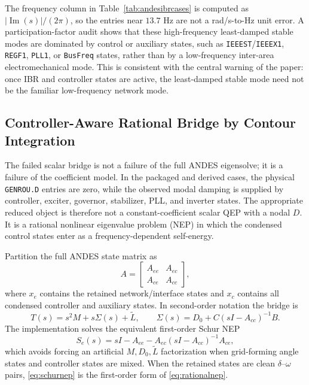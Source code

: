 \documentclass[journal]{IEEEtran}
\newcommand{\Lt}{\widetilde L}
\newcommand{\Imag}{\operatorname{Im}}
\begin{document}
The frequency column in Table~\ref{tab:andesibrcases} is computed as $|\Imag(s)|/(2\pi)$, so the entries near $13.7$ Hz are not a rad/s-to-Hz unit error. A participation-factor audit shows that these high-frequency least-damped stable modes are dominated by control or auxiliary states, such as \texttt{IEEEST}/\texttt{IEEEX1}, \texttt{REGF1}, \texttt{PLL1}, or \texttt{BusFreq} states, rather than by a low-frequency inter-area electromechanical mode. This is consistent with the central warning of the paper: once IBR and controller states are active, the least-damped stable mode need not be the familiar low-frequency network mode.

\subsection{Controller-Aware Rational Bridge by Contour Integration}

The failed scalar bridge is not a failure of the full ANDES eigensolve; it is a failure of the coefficient model. In the packaged and derived cases, the physical \texttt{GENROU.D} entries are zero, while the observed modal damping is supplied by controller, exciter, governor, stabilizer, PLL, and inverter states. The appropriate reduced object is therefore not a constant-coefficient scalar QEP with a nodal $D$. It is a rational nonlinear eigenvalue problem (NEP) in which the condensed control states enter as a frequency-dependent self-energy.

Partition the full ANDES state matrix as
\begin{equation}
A=\begin{bmatrix}A_{ee} & A_{ec}\\ A_{ce} & A_{cc}\end{bmatrix},
\end{equation}
where $x_e$ contains the retained network/interface states and $x_c$ contains all condensed controller and auxiliary states. In second-order notation the bridge is
\begin{equation}
T(s)=s^2M+s\Sigma(s)+\Lt,\qquad
\Sigma(s)=D_0+C(sI-A_{cc})^{-1}B.
\label{eq:rationalnep}
\end{equation}
The implementation solves the equivalent first-order Schur NEP
\begin{equation}
S_e(s)=sI-A_{ee}-A_{ec}(sI-A_{cc})^{-1}A_{ce},
\label{eq:schurnep}
\end{equation}
which avoids forcing an artificial $M,D_0,\Lt$ factorization when grid-forming angle states and controller states are mixed. When the retained states are clean $\delta$--$\omega$ pairs, \eqref{eq:schurnep} is the first-order form of \eqref{eq:rationalnep}.
\end{document}
